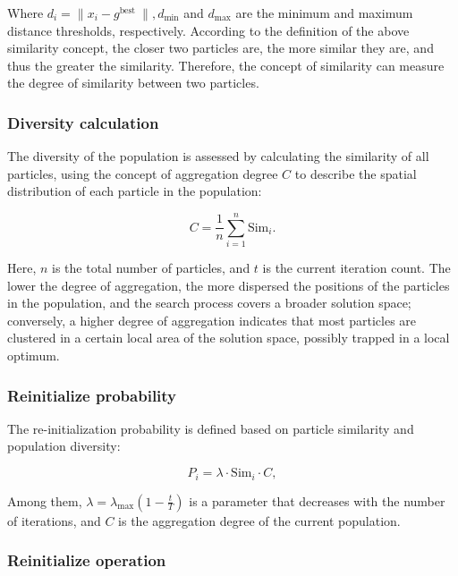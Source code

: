 \documentclass[lettersize,journal]{IEEEtran}
\begin{document}
Where \(d_{i} = \left. \parallel x_{i} - g^{\text{best~}} \right.\parallel,d_{\min}\) and \(d_{\max}\) are the minimum and maximum distance thresholds, respectively. According to the definition of the above similarity concept, the closer two particles are, the more similar they are, and thus the greater the similarity. Therefore, the concept of similarity can measure the degree of similarity between two particles.

\subsubsection{Diversity calculation}\label{diversity-calculation}

The diversity of the population is assessed by calculating the similarity of all particles, using the concept of aggregation degree \(C\) to describe the spatial distribution of each particle in the
population:

\begin{equation}
  C = \frac{1}{n} \sum_{i=1}^{n} \text{Sim}_{i}.
  \label{eq:aggregation_degree}
\end{equation}

Here, \(n\) is the total number of particles, and \(t\) is the current iteration count. The lower the degree of aggregation, the more dispersed the positions of the particles in the population, and the search process covers a broader solution space; conversely, a higher degree of aggregation indicates that most particles are clustered in a certain local area of the solution space, possibly trapped in a local optimum.

\subsubsection{Reinitialize probability}\label{reinitialize-probability}

The re-initialization probability is defined based on particle similarity and population diversity:

\begin{equation}
  P_{i} = \lambda \cdot \text{Sim}_{i} \cdot C,
  \label{eq:reinitialization_probability}
\end{equation}

Among them, \(\lambda = \lambda_{\max}\left( 1 - \frac{t}{T} \right)\) is a parameter that decreases with the number of iterations, and \(C\) is the aggregation degree of the current population.

\subsubsection{Reinitialize operation}\label{reinitialize-operation}
\end{document}
